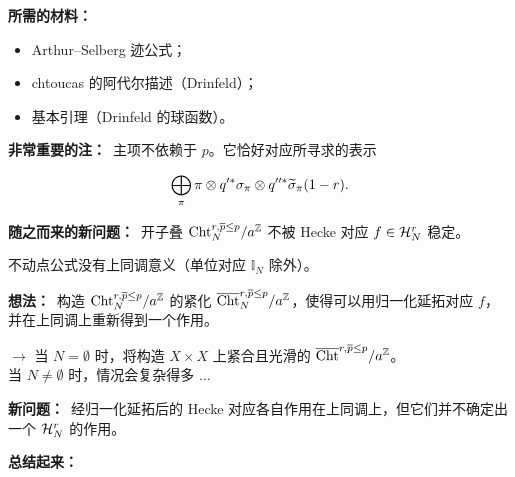 

\par\medskip
\noindent\textbf{所需的材料：}

\begin{itemize}
\item Arthur--Selberg 迹公式；
\item chtoucas 的阿代尔描述（Drinfeld）；
\item 基本引理（Drinfeld 的球函数）。
\end{itemize}

\par\medskip
\noindent\textbf{非常重要的注：}\ 主项不依赖于 $p$。它恰好对应所寻求的表示

\[ \bigoplus_{\pi} \pi \otimes q'^*\sigma_\pi \otimes q''^*\widetilde{\sigma}_\pi(1 - r). \]

\par\medskip
\noindent\textbf{随之而来的新问题：}\ 开子叠 $\mathrm{Cht}^{r,\overline{p}\le p}_N/a^{\mathbb{Z}}$ 不被 Hecke 对应 $f \in \mathcal{H}^r_N$ 稳定。

不动点公式没有上同调意义（单位对应 $\mathbb{I}_N$ 除外）。

\medskip
\noindent\textbf{想法：}\ 构造 $\mathrm{Cht}^{r,\overline{p}\le p}_N/a^{\mathbb{Z}}$ 的紧化 $\overline{\mathrm{Cht}}^{r,\overline{p}\le p}_N/a^{\mathbb{Z}}$，使得可以用归一化延拓对应 $f$，并在上同调上重新得到一个作用。

$\rightarrow$ 当 $N = \emptyset$ 时，将构造 $X \times X$ 上紧合且光滑的 $\overline{\mathrm{Cht}}^{r,\overline{p}\le p}/a^{\mathbb{Z}}$。\\
当 $N \neq \emptyset$ 时，情况会复杂得多 $\ldots$

\medskip
\noindent\textbf{新问题：}\ 经归一化延拓后的 Hecke 对应各自作用在上同调上，但它们并不确定出一个 $\mathcal{H}^r_N$ 的作用。


\par\medskip
\noindent\textbf{总结起来：}

